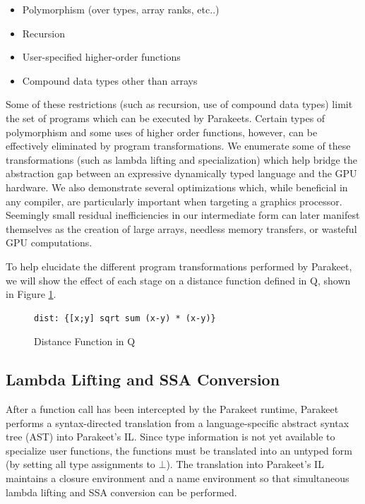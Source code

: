 \documentclass[preprint]{sigplanconf}
\begin{document}
\begin{itemize}
\item Polymorphism (over types, array ranks, etc..) 
\item Recursion
\item User-specified higher-order functions
\item Compound data types other than arrays
\end{itemize}

Some of these restrictions (such as recursion, use of compound data types) limit the set of programs which can be executed by Parakeets. Certain types of polymorphism and some uses of higher order functions, however, can be effectively eliminated by program transformations. We enumerate some of these transformations (such as lambda lifting and specialization) which help bridge the abstraction gap between an expressive dynamically typed language and the GPU hardware. We also demonstrate several optimizations which, while beneficial in any compiler, are particularly important when targeting a graphics processor. Seemingly small residual inefficiencies in our intermediate form can later manifest themselves as the creation of large arrays, needless memory transfers, or wasteful GPU computations.

To help elucidate the different program transformations performed by Parakeet, we will show the effect of each stage on a distance function defined in Q, shown in Figure \ref{QDist}.

\begin{figure}[h!]
    \begin{lstlisting}[numbers=none]
    dist: {[x;y] sqrt sum (x-y) * (x-y)}
    \end{lstlisting}
    \caption{Distance Function in Q}
    \label{QDist}
\end{figure}

\subsection{Lambda Lifting and SSA Conversion}
After a function call has been intercepted by the Parakeet runtime, Parakeet performs a syntax-directed translation from a language-specific abstract syntax tree (AST) into Parakeet's IL. Since type information is not yet available to specialize user functions, the functions must be translated into an untyped
form (by setting all type assignments to $\bot$). The translation into Parakeet's IL maintains a closure environment and a name environment so that simultaneous lambda lifting and SSA conversion can be performed.
\end{document}
